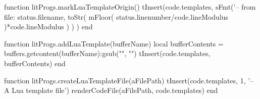 
\startchapter[title=Lua Templates]

\startMkIVCode
{}
\setuptyping[Template][option=lua]

\let\oldStartLuaTemplate=\startLuaTemplate
\def\startLuaTemplate{%
  \directlua{thirddata.literateProgs.markLuaTemplateOrigin()}%
  \oldStartLuaTemplate%
}

\let\oldStopLuaTemplate=\stopLuaTemplate
\def\stopLuaTemplate{%
  \oldStopLuaTemplate%
  \directlua{thirddata.literateProgs.addLuaTemplate('_typing_')}}

\def\createTemplateFile[#1]{
  \directlua{thirddata.literateProgs.createLuaTemplateFile('#1')}
}
\stopMkIVCode

\startLuaCode
function litProgs.markLuaTemplateOrigin()
  tInsert(code.templates,
    sFmt('-- from file: %
      status.filename,
      toStr(
        mFloor(
          status.linenumber/code.lineModulus
        )*code.lineModulus
      )
    )
  )
end

function litProgs.addLuaTemplate(bufferName)
  local bufferContents = buffers.getcontent(bufferName):gsub("", "\n")
  tInsert(code.templates, bufferContents)
end

function litProgs.createLuaTemplateFile(aFilePath)
  tInsert(code.templates, 1, '-- A Lua template file')
  renderCodeFile(aFilePath, code.templates)
end
\stopLuaCode

\stopchapter
